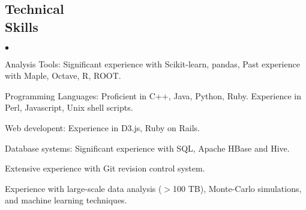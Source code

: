 \documentclass[margin,line]{res}
\newenvironment{list2}{
  \begin{list}{$\bullet$}{%
      \setlength{\itemsep}{0in}
      \setlength{\parsep}{0in} \setlength{\parskip}{0in}
      \setlength{\topsep}{0in} \setlength{\partopsep}{0in}
      \setlength{\leftmargin}{0.2in}}}{\end{list}}
\begin{document}
\begin{resume}



\section{\sc Technical \\ Skills}
\begin{list2}
\item Analysis Tools: Significant experience with Scikit-learn,
  pandas,  Past experience with Maple, Octave, R, ROOT. %
\item Programming Languages: Proficient in C++, Java, Python, Ruby.
  Experience in Perl, Javascript, Unix shell scripts.
\item Web developent: Experience in D3.js, Ruby on Rails.
\item Database systems: Significant experience with SQL, Apache HBase and Hive. %
\item Extensive experience with Git revision control system.
\item Experience with large-scale data analysis ($>$100 TB), Monte-Carlo simulations,
and machine learning techniques.
\end{list2}




\end{resume}
\end{document}
